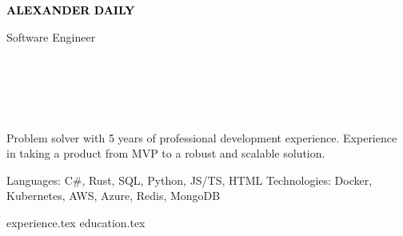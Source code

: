 \documentclass[11pt]{developercv} %
\begin{document}

\begin{minipage}[t]{0.4\textwidth} 
	\vspace{-\baselineskip} %
	
	{ \fontsize{16}{20} \textcolor{black}{\textbf{\MakeUppercase{Alexander Daily}}}} %
	
	\vspace{6pt}
	
	{\Large Software Engineer} %
\end{minipage}
\hfill
\begin{minipage}[t]{0.35\textwidth} %
	\vspace{-\baselineskip} %
	
	\\	
    \\
    \\
    \\    
    
\end{minipage}


  Problem solver with 5 years of professional development experience. Experience in taking a product from MVP to a robust and scalable solution.\\
	\vspace{-8pt}

    \vspace{-6pt}

\begin{entrylist}
      \entry 
      {Languages:}
      {C\#, Rust, SQL, Python, JS/TS, HTML}
      {}
      {}
      \entry 
      {Technologies:}
      {Docker, Kubernetes, AWS, Azure, Redis, MongoDB}
      {}
      {}
\end{entrylist}
    
{experience.tex}
{education.tex}
\end{document}
